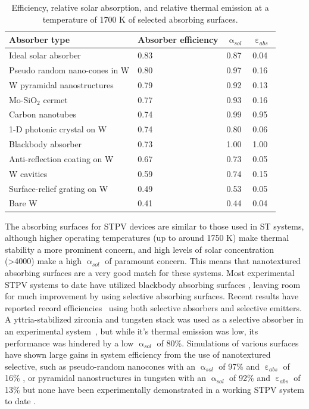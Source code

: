 \documentclass[10pt,letterpaper]{article}
\begin{document}
\begin{table}
	\caption{Efficiency, relative solar absorption, and relative thermal emission at a temperature of 1700 K of selected absorbing surfaces.}
	\label{abs_eff_table}
	\begin{center}
		\begin{tabular}{|llll|}
			\hline
			Absorber type & Absorber efficiency & $\upalpha_{sol}$ & $\upepsilon_{abs}$\\
			\hline	
			Ideal solar absorber & 0.83 & 0.87 & 0.04\\
			Pseudo random nano-cones in W & 0.80 & 0.97 & 0.16~\cite{me1}\\
			W pyramidal nanostructures & 0.79 & 0.92 & 0.13~\cite{paper1_ref4}\\
			Mo-SiO$_2$ cermet & 0.77 & 0.93 & 0.16~\cite{cermet6}\\
			Carbon nanotubes & 0.74 & 0.99 & 0.95~\cite{MIT_paper}\\
			1-D photonic crystal on W & 0.74 & 0.80 & 0.06~\cite{SKY_JPE_2015}\\
			Blackbody absorber & 0.73 & 1.00 & 1.00\\
			Anti-reflection coating on W & 0.67 & 0.73 & 0.05~\cite{SKY_JPE_2015}\\
			W cavities & 0.59 & 0.74 & 0.15~\cite{exp_russia}\\
			Surface-relief grating on W & 0.49 & 0.53 & 0.05~\cite{paper1_ref6}\\
			Bare W & 0.41 & 0.44 & 0.04~\cite{palik}\\
			\hline
		\end{tabular}
	\end{center}
\end{table}

The absorbing surfaces for STPV devices are similar to those used in ST systems, although higher operating temperatures (up to around 1750 K) 
make thermal stability a more prominent concern, and high levels of solar concentration (\textgreater4000) make a high $\upalpha_{sol}$ of 
paramount concern.  This means that nanotextured absorbing surfaces are a very good match for these systems.  Most experimental STPV systems 
to date have utilized blackbody absorbing surfaces \cite{exp_tokyo,exp_madrid,exp_russia,MIT_paper}, leaving room for much improvement by using 
selective absorbing surfaces. Recent results have reported record efficiencies~\cite{g11,SKY_JPE_2015} using both 
selective absorbers and selective emitters. A yttria-stabilized zirconia and tungsten stack was used as a selective absorber in an experimental system~\cite{SKY_JPE_2015}, 
but while it's thermal emission was low, its performance was hindered by a low $\upalpha_{sol}$ of 80\%.  Simulations of various surfaces 
have shown large gains in system efficiency from the use of nanotextured selective, such as pseudo-random 
nanocones with an $\upalpha_{sol}$ of 97\% and $\upepsilon_{abs}$ of 16\% \cite{me1}, or pyramidal nanostructures in tungsten 
with an $\upalpha_{sol}$ of 92\% and $\upepsilon_{abs}$ of 13\% \cite{paper1_ref4} but none have been experimentally 
demonstrated in a working STPV system to date \cite{paper1_ref5,paper1_ref6}.
\end{document}
